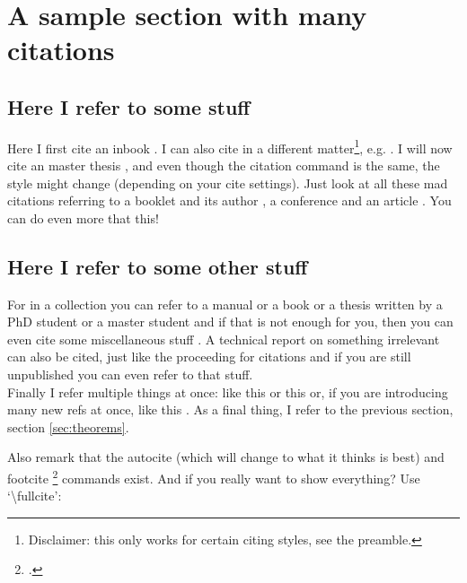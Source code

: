 \documentclass[thesis]{subfiles}
\begin{document}
\section{A sample section with many citations}

\subsection{Here I refer to some stuff}
Here I first cite an inbook \cite{inbook}. I can also cite in a different matter\footnote{Disclaimer: this only works for certain citing styles, see the preamble.}, e.g. \textcite{inbook}. I will now cite an master thesis \cite{mastersthesis}, and even though the citation command is the same, the style might change (depending on your cite settings). Just look at all these mad citations referring to a booklet \cite{booklet} and its author \parencite{booklet}, a conference \cite{conference} and an article \cite{article}. You can do even more that this! 

\subsection{Here I refer to some other stuff}
For in a collection \cite{incollection} you can refer to a manual \cite{manual} or a book \cite{book} or a thesis written by a PhD student \cite{phdthesis} or a master student \cite{mastersthesis} and if that is not enough for you, then you can even cite some miscellaneous stuff \cite{misc}. A technical report on something irrelevant \cite{techreport} can also be cited, just like the proceeding for citations \cite{proceedings} and if you are still unpublished \cite{unpublished} you can even refer to that stuff.\\
Finally I refer multiple things at once: like this \cite{misc,phdthesis} or this \cite{incollection,conference,techreport} or, if you are introducing many new refs at once, like this \cite{inbook,mastersthesis,booklet,conference} . As a final thing, I refer to the previous section, section \ref{sec:theorems}.

Also remark that the autocite (which will change to what it thinks is best) \autocite{reference} and footcite \footcite{reference} commands exist.
\bigbreak
And if you really want to show everything? Use  `\textbackslash fullcite':\newline  {}
\end{document}
